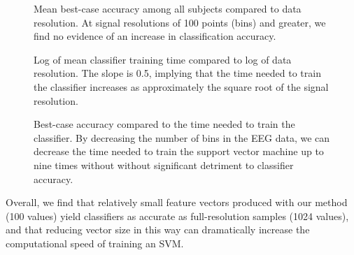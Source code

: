 \begin{figure}[!h]
  \centering
   {}
  \caption{Mean best-case accuracy among all subjects compared to data resolution. At signal resolutions of 100 points (bins) and greater, we find no evidence of an increase in classification accuracy. }
  \label{fig:accuracy_vs_bins}
  \vspace{-0.1cm}
 \end{figure}

 \begin{figure}[!h]
  \vspace{-0.2cm}
  \centering
   {}
  \caption{Log of mean classifier training time compared to log of data resolution. The slope is 0.5, implying that the time needed to train the classifier increases as approximately the square root of the signal resolution.}
  \label{fig:training_vs_bins}
  \vspace{-0.1cm}
 \end{figure}

\begin{figure}[!h]
  \vspace{-0.2cm}
  \centering
   {}
  \caption{ Best-case accuracy compared to the time needed to train the classifier. By decreasing the number of bins in the EEG data, we can decrease the time needed to train the support vector machine up to nine times without without significant detriment to classifier accuracy. }
  \label{fig:accuracy_vs_training}
 \end{figure}

Overall, we find that relatively small feature vectors produced with our method (100 values) yield classifiers as accurate as full-resolution samples (1024 values), and that reducing vector size in this way can dramatically increase the computational speed of training an SVM. 
